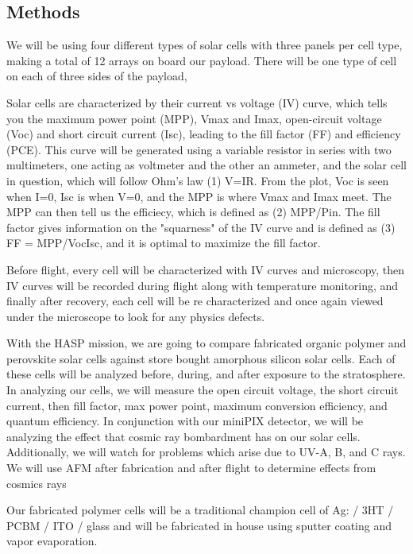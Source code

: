 {\subsection{Methods}
    
    We will be using four different types of solar cells with three panels per cell type, making a total of 12 arrays on board our payload. There will be one type of cell on each of three sides of the payload, 

	Solar cells are characterized by their current vs voltage (IV) curve, which tells you the maximum power point (MPP), Vmax and Imax, open-circuit voltage (Voc) and short circuit current (Isc), leading to the fill factor (FF) and efficiency (PCE). This curve will be  generated using a variable resistor in series with two multimeters, one acting as voltmeter and the other an ammeter, and the solar cell in question, which will follow Ohm's law (1) V=IR. From the plot, Voc is seen when I=0, Isc is when V=0, and the MPP is where Vmax and Imax meet. The MPP can then tell us the efficiecy, which is defined as (2) MPP/Pin. The fill factor gives information on the "squarness" of the IV curve and is defined as (3) FF = MPP/VocIsc, and it is optimal to maximize the fill factor.

    Before flight, every cell will be characterized with IV curves and microscopy, then IV curves will be recorded during flight along with temperature monitoring, and finally after recovery, each cell will be re characterized and once again viewed under the microscope to look for any physics defects. 
    
    With the HASP mission, we are going to compare fabricated organic polymer and perovskite solar cells against store bought amorphous silicon solar cells. Each of these cells will be analyzed before, during, and after exposure to the stratosphere. In analyzing our cells, we will measure the open circuit voltage, the short circuit current, then fill factor,  max power point, maximum conversion efficiency, and quantum efficiency.
    In conjunction with our miniPIX detector, we will be analyzing the effect that cosmic ray bombardment has on our solar cells.  Additionally, we will watch for problems which arise due to UV-A, B, and C rays. We will use AFM after fabrication and after flight to determine effects from cosmics rays
    


Our fabricated polymer cells will be a traditional champion cell of Ag: / 3HT / PCBM / ITO / glass and will be fabricated in house using sputter coating and vapor evaporation.

}
